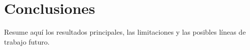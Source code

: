 \documentclass[main.tex]{subfiles}
\begin{document}
\chapter{Conclusiones}

Resume aquí los resultados principales, las limitaciones y las posibles líneas de trabajo futuro.
\end{document}
